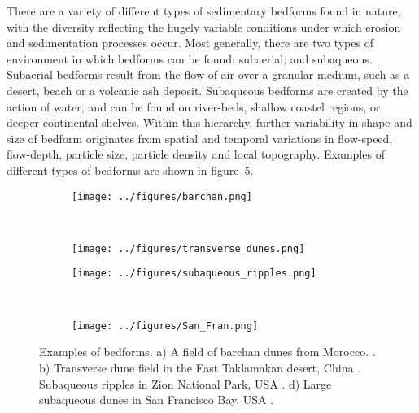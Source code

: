 \documentclass[12pt]{article}
\begin{document}
There are a variety of different types of sedimentary bedforms found in nature, with the diversity reflecting the hugely variable conditions under which erosion and sedimentation processes occur. Most generally, there are two types of environment in which bedforms can be found: subaerial; and subaqueous. Subaerial bedforms result from the flow of air over a granular medium, such as a desert, beach or a volcanic ash deposit. Subaqueous bedforms are created by the action of water, and can be found on river-beds, shallow coastel regions, or deeper continental shelves. Within this hierarchy, further variability in shape and size of bedform originates from spatial and temporal variations in flow-speed, flow-depth, particle size, particle density and local topography. Examples of different types of bedforms are shown in figure~\ref{fig:bedforms}.


\begin{figure}
    \centering
    \begin{subfigure}[b]{0.45\textwidth}
        \texttt{[image: ../figures/barchan.png]}
        \caption{}
        \label{fig:barchan}
    \end{subfigure}
    ~ %
    \begin{subfigure}[b]{0.45\textwidth}
        \texttt{[image: ../figures/transverse\_dunes.png]}
        \caption{}
        \label{fig:trans}
    \end{subfigure}

    \begin{subfigure}[b]{0.45\textwidth}
        \texttt{[image: ../figures/subaqueous\_ripples.png]}
        \caption{}
        \label{fig:subaq_rip}
    \end{subfigure}
    ~ %
    \begin{subfigure}[b]{0.45\textwidth}
        \texttt{[image: ../figures/San\_Fran.png]}
        \caption{}
        \label{fig:SF}
    \end{subfigure}

    \caption{Examples of bedforms. a) A field of barchan dunes from Morocco. \citep{Duran11}. b) Transverse dune field in the East Taklamakan desert, China \citep{Gao15}. Subaqueous ripples in Zion National Park, USA \citep{Andreotti12}. d) Large subaqueous dunes in San Francisco Bay, USA \citep{Barnard06}.\label{fig:bedforms}}
\end{figure}
\end{document}
